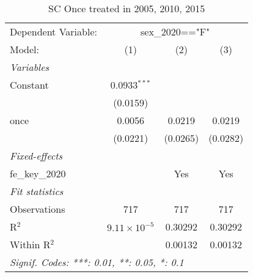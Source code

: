 
\begin{table}[htbp]
   \caption{SC Once treated in 2005, 2010, 2015}
   \centering
   \begin{tabular}{lccc}
      \tabularnewline \midrule \midrule
      Dependent Variable: & \multicolumn{3}{c}{sex\_2020=="F"}\\
      Model:          & (1)                   & (2)      & (3)\\  
      \midrule
      \emph{Variables}\\
      Constant        & 0.0933$^{***}$        &          &   \\   
                      & (0.0159)              &          &   \\   
      once            & 0.0056                & 0.0219   & 0.0219\\   
                      & (0.0221)              & (0.0265) & (0.0282)\\   
      \midrule
      \emph{Fixed-effects}\\
      fe\_key\_2020   &                       & Yes      & Yes\\  
      \midrule
      \emph{Fit statistics}\\
      Observations    & 717                   & 717      & 717\\  
      R$^2$           & $9.11\times 10^{-5}$  & 0.30292  & 0.30292\\  
      Within R$^2$    &                       & 0.00132  & 0.00132\\  
      \midrule \midrule
      \multicolumn{4}{l}{\emph{Signif. Codes: ***: 0.01, **: 0.05, *: 0.1}}\\
   \end{tabular}
\end{table}


